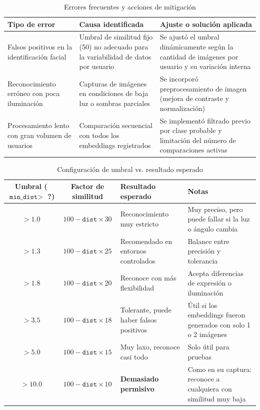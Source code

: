 \begin{table}[H]
    \centering
    \caption{Errores frecuentes y acciones de mitigación}
    \label{tab:errores_ajustes}
    \renewcommand{\arraystretch}{1.3}
    \begin{tabular}{|p{4cm}|p{6cm}|p{4.5cm}|}
        \hline
        \textbf{Tipo de error} & \textbf{Causa identificada} & \textbf{Ajuste o solución aplicada} \\
        \hline
        Falsos positivos en la identificación facial & Umbral de similitud fijo (50) no adecuado para la variabilidad de datos por usuario & Se ajustó el umbral dinámicamente según la cantidad de imágenes por usuario y su variación interna \\
        \hline
        Reconocimiento erróneo con poca iluminación & Capturas de imágenes en condiciones de baja luz o sombras parciales & Se incorporó preprocesamiento de imagen (mejora de contraste y normalización) \\
		\hline
		Procesamiento lento con gran volumen de usuarios & Comparación secuencial con todos los embeddings registrados & Se implementó filtrado previo por clase probable y limitación del número de comparaciones activas \\
		\hline
    \end{tabular}
\end{table}

\begin{table}[H]
\centering
\caption{Configuración de umbral vs. resultado esperado}
\label{tab:umbral_similitud}
\renewcommand{\arraystretch}{1.3}
\scriptsize
\begin{tabular}{|c|c|p{3.5cm}|p{5cm}|}
\hline
\textbf{Umbral ($\texttt{min\_dist} >$ ?)} & \textbf{Factor de similitud} & \textbf{Resultado esperado} & \textbf{Notas} \\
\hline
$> 1.0$ & $100 - \texttt{dist} \times 30$ & Reconocimiento muy estricto & Muy preciso, pero puede fallar si la luz o ángulo cambia \\
\hline
$> 1.3$ & $100 - \texttt{dist} \times 25$ & Recomendado en entornos controlados & Balance entre precisión y tolerancia \\
\hline
$> 1.8$ & $100 - \texttt{dist} \times 20$ & Reconoce con más flexibilidad & Acepta diferencias de expresión o iluminación \\
\hline
$> 3.5$ & $100 - \texttt{dist} \times 18$ & Tolerante, puede haber falsos positivos & Útil si los embeddings fueron generados con solo 1 o 2 imágenes \\
\hline
$> 5.0$ & $100 - \texttt{dist} \times 15$ & Muy laxo, reconoce casi todo & Solo útil para pruebas \\
\hline
$> 10.0$ & $100 - \texttt{dist} \times 10$ & \textbf{Demasiado permisivo} & Como en su captura: reconoce a cualquiera con similitud muy baja \\
\hline
\end{tabular}
\end{table}


